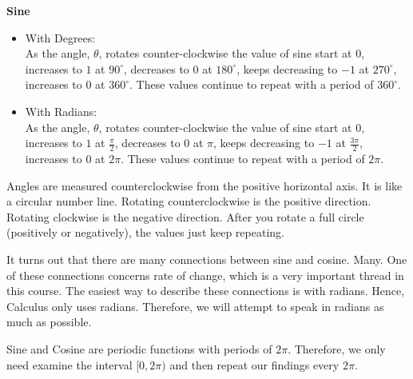 \documentclass{ximera}
\begin{document}
\begin{idea} \textbf{\textcolor{green!50!black}{Sine}}
\begin{itemize}
\item With Degrees: \\
As the angle, $\theta$, rotates counter-clockwise the value of sine start at $0$, increases to $1$ at $90^\circ$, decreases to $0$ at $180^\circ$, keeps decreasing to $-1$ at $270^\circ$, increases to $0$ at $360^\circ$.  These values continue to repeat with a period of $360^\circ$.

\item With Radians: \\
As the angle, $\theta$, rotates counter-clockwise the value of sine start at $0$, increases to $1$ at $\frac{\pi}{2}$, decreases to $0$ at $\pi$, keeps decreasing to $-1$ at $\frac{3\pi}{2}$, increases to $0$ at $2\pi$.  These values continue to repeat with a period of $2\pi$.
\end{itemize}
\end{idea}



Angles are measured counterclockwise from the positive horizontal axis.  It is like a circular number line.  Rotating counterclockwise is the positive direction.  Rotating clockwise is the negative direction.  After you rotate a full circle (positively or negatively), the values just keep repeating.



\begin{onlineOnly}

\begin{center}
\end{center}

\end{onlineOnly}




\begin{warning}
It turns out that there are many connections between sine and cosine. Many. One of these connections concerns rate of change, which is a very important thread in this course.  The easiest way to describe these connections is with radians. Hence, Calculus only uses radians. Therefore, we will attempt to speak in radians as much as possible.
\end{warning}



Sine and Cosine are periodic functions with periods of $2\pi$. Therefore, we only need examine the interval $[0, 2\pi)$ and then repeat our findings every $2\pi$. \\
\end{document}
